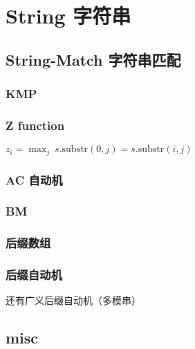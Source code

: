 
\section{String 字符串}

\subsection{String-Match 字符串匹配}

\subsubsection{KMP}


\subsubsection{Z function}

$z_i = \max_{j} ~ s.\text{substr}(0, j) = s.\text{substr}(i, j)$


\subsubsection{AC 自动机}


\subsubsection{BM}


\subsubsection{后缀数组}


\subsubsection{后缀自动机}


还有广义后缀自动机（多模串）


\subsection{misc}

